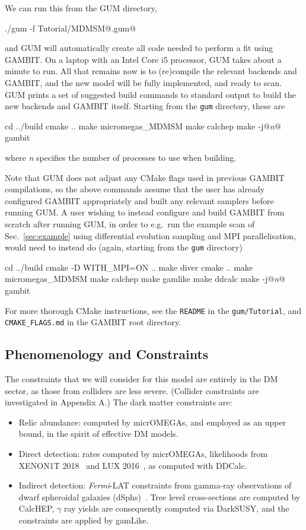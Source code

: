 \documentclass[pdftex,twocolumn,epjc3_preprint,runningheads]{svjour3}
\renewcommand{\_}{\discretionary{\underscore}{}{\underscore}}
\newcommand\term[1]{{\lstset{style=terminal}\lstinline!#1!\lstset{style=cpp}}}
\newcommand\textinline[1]{{{\lstset{style=text}\lstinline!#1!}}}
\newcommand{\metavarf}[1]{\textit{\color{darkgreen}\footnotesize\textrm{#1}}}
\newcommand{\metavar}{\metavarf}
\newcommand{\gambit}{\textsf{GAMBIT}\xspace}
\newcommand{\GB}{\gambit}
\newcommand{\mpi}{\textsf{MPI}\xspace}
\newcommand{\ds}{\textsf{DarkSUSY}\xspace}
\newcommand{\darksusy}{\ds}
\newcommand{\mo}{\micromegas}
\newcommand{\micromegas}{\textsf{micrOMEGAs}\xspace}
\newcommand\gamLike{\textsf{gamLike}\xspace}
\newcommand\gamlike{\gamLike}
\newcommand\ddcalc{\textsf{DDCalc}\xspace}
\newcommand{\gum}{\textsf{GUM}\xspace}
\newcommand{\CH}{\textsf{CalcHEP}\xspace}
\newcommand\cmake{\textsf{CMake}\xspace}
\begin{document}
We can run this from the \gum directory,
%
\begin{lstterm}
./gum -f Tutorial/MDMSM@.gum@
\end{lstterm}
%
and \gum will automatically create all code needed to perform a fit using \GB. On a laptop with an Intel Core i5 processor, \gum takes about a minute to run. All that remains now is to (re)compile the relevant backends and \GB, and the new model will be fully implemented, and ready to scan. \gum prints a set of suggested build commands to standard output to build the new backends and \GB itself.  Starting from the \textinline{gum} directory, these are
%
\begin{lstterm}
cd ../build
cmake ..
make micromegas_MDMSM
make calchep
make -j@\metavar{n}@ gambit
\end{lstterm}
%
where \metavar{n} specifies the number of processes to use when building.

Note that \gum does not adjust any \cmake flags used in previous \GB compilations, so the above commands assume that the user has already configured \GB appropriately and built any relevant samplers before running \gum.  A user wishing to instead configure and build \GB from scratch after running \gum, in order to e.g.\ run the example scan of Sec.\ \ref{sec:example} using differential evolution sampling and \mpi parallelisation, would need to instead do (again, starting from the \textinline{gum} directory)
\begin{lstterm}
cd ../build
cmake -D WITH_MPI=ON ..
make diver
cmake ..
make micromegas_MDMSM
make calchep
make gamlike
make ddcalc
make -j@\metavar{n}@ gambit
\end{lstterm}
%
For more thorough \cmake instructions, see the \term{README} in the \term{gum/Tutorial}, and \term{CMAKE_FLAGS.md} in the \GB root directory.

\subsection{Phenomenology and Constraints}
\label{sec:pheno}

The constraints that we will consider for this model are entirely in the DM sector, as those from colliders are less severe. (Collider constraints are investigated in Appendix A.) The dark matter constraints are:

\begin{itemize}
  \item Relic abundance: computed by \mo, and employed as an upper bound, in the spirit of effective DM models.
  \item Direct detection: rates computed by \mo, likelihoods from XENON1T 2018~\cite{Aprile:2018dbl} and LUX 2016~\cite{LUX2016}, as computed with \ddcalc \cite{DarkBit,HP,SSDM2}.
  \item Indirect detection: \emph{Fermi}-LAT constraints from gamma-ray observations of dwarf spheroidal galaxies (dSphs)~\cite{LATdwarfP8}. Tree level cross-sections are computed by \CH, $\gamma$ ray yields are consequently computed via \darksusy \cite{darksusy4,darksusy}, and the constraints are applied by \gamlike \cite{DarkBit}.
\end{itemize}
\end{document}
